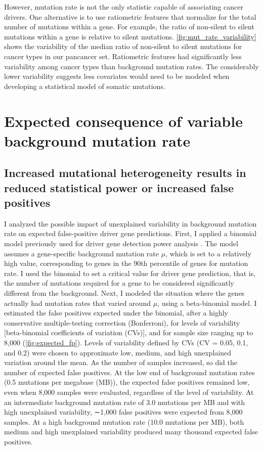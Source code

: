 However, mutation rate is not the only statistic capable of associating cancer drivers. One alternative is to use ratiometric features that normalize for the total number of mutations within a gene. For example, the ratio of non-silent to silent mutations within a gene is relative to silent mutations. \autoref{fig:mut_rate_variability} shows the variability of the median ratio of non-silent to silent mutations for cancer types in our pancancer set. Ratiometric features had significantly less variability among cancer types than background mutation rates. The considerably lower variability suggests less covariates would need to be modeled when developing a statistical model of somatic mutations.

\section{Expected consequence of variable background mutation rate}

\subsection{Increased mutational heterogeneity results in reduced statistical power or increased false positives}

I analyzed the possible impact of unexplained variability in background mutation rate on expected false-positive driver gene predictions. First, I applied a binomial model previously used for driver gene detection power analysis \cite{RN14}. The model assumes a gene-specific background mutation rate $\mu$, which is set to a relatively high value, corresponding to genes in the 90th percentile of genes for mutation rate. I used the binomial to set a critical value for driver gene prediction, that is, the number of mutations required for a gene to be considered significantly different from the background. Next, I modeled the situation where the genes actually had mutation rates that varied around $\mu$, using a beta-binomial model. I estimated the false positives expected under the binomial, after a highly conservative multiple-testing correction (Bonferroni), for levels of variability [beta-binomial coefficients of variation (CVs)], and for sample size ranging up to 8,000 (\autoref{fig:expected_fp}). Levels of variability defined by CVs (CV = 0.05, 0.1, and 0.2) were chosen to approximate low, medium, and high unexplained variation around the mean. As the number of samples increased, so did the number of expected false positives. At the low end of background mutation rates (0.5 mutations per megabase (MB)), the expected false positives remained low, even when 8,000 samples were evaluated, regardless of the level of variability. At an intermediate background mutation rate of 3.0 mutations per MB and with high unexplained variability, ∼1,000 false positives were expected from 8,000 samples. At a high background mutation rate (10.0 mutations per MB), both medium and high unexplained variability produced many thousand expected false positives.

